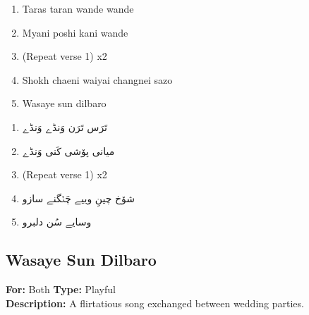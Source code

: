 \documentclass[12pt]{article}
\newcommand{\bigroman}[1]{\fontsize{16pt}{18pt}\selectfont\RaggedRight #1}
\newcommand{\bigarabic}[1]{\fontsize{16pt}{18pt}\selectfont \textarabic{#1}}
\begin{document}
        \begin{multicols}{2}
          \begin{enumerate}[leftmargin=*, label=\arabic*., font=\fontsize{16pt}{18pt}\selectfont]
            \item \bigroman{Taras taran wande wande}
            \item \bigroman{Myani poshi kani wande}
            \item \bigroman{(Repeat verse 1) x2}
            \item \bigroman{Shokh chaeni waiyai changnei sazo}
            \item \bigroman{Wasaye sun dilbaro}
          \end{enumerate}
          
          \columnbreak
          
          \begin{RTL}
          \begin{enumerate}[leftmargin=*, label=\arabic*., font=\fontsize{16pt}{18pt}\selectfont]
            \item \bigarabic{تَرَس تَرَن وَنڈے وَنڈے}
            \item \bigarabic{میانی پۆشی کَنی وَنڈے}
            \item \bigarabic{(Repeat verse 1) x2}
            \item \bigarabic{شۆخ چینِ وییے چَنٛگنے سازو}
            \item \bigarabic{وسایے سُن دلبرو}
          \end{enumerate}
          \end{RTL}
          \end{multicols}



  
\subsection*{Wasaye Sun Dilbaro}
\textbf{For:} Both \quad \textbf{Type:} Playful\\
\textbf{Description:} A flirtatious song exchanged between wedding parties.
\end{document}
